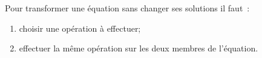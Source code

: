 Pour transformer une équation sans changer ses solutions il faut~:
\begin{enumerate}
    \item choisir une opération à effectuer;
    \item effectuer la même opération sur les deux membres de l'équation.
\end{enumerate}